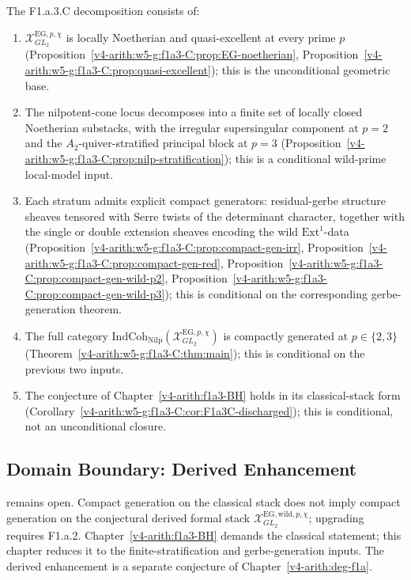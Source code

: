 \begin{proposition}[domain of F1.a.3.C]
\label{v4-arith:w5-g:f1a3-C:prop:domain-summary}
The F1.a.3.C decomposition consists of:
\begin{enumerate}
\item \(\mathcal{X}^{\mathrm{EG},p,\chi}_{GL_{2}}\) is locally
Noetherian and quasi-excellent at every prime \(p\)
(Proposition~\ref{v4-arith:w5-g:f1a3-C:prop:EG-noetherian},
Proposition~\ref{v4-arith:w5-g:f1a3-C:prop:quasi-excellent}); this is the
unconditional geometric base.
\item The nilpotent-cone locus decomposes into a finite set of
locally closed Noetherian substacks, with the irregular supersingular
component at \(p=2\) and the \(A_{2}\)-quiver-stratified principal block
at \(p=3\)
(Proposition~\ref{v4-arith:w5-g:f1a3-C:prop:nilp-stratification}); this is a
conditional wild-prime local-model input.
\item Each stratum admits explicit compact generators: residual-gerbe
structure sheaves tensored with Serre twists of the determinant character,
together with the single or double extension sheaves encoding the wild
\(\mathrm{Ext}^{1}\)-data
(Proposition~\ref{v4-arith:w5-g:f1a3-C:prop:compact-gen-irr},
Proposition~\ref{v4-arith:w5-g:f1a3-C:prop:compact-gen-red},
Proposition~\ref{v4-arith:w5-g:f1a3-C:prop:compact-gen-wild-p2},
Proposition~\ref{v4-arith:w5-g:f1a3-C:prop:compact-gen-wild-p3}); this is
conditional on the corresponding gerbe-generation theorem.
\item The full category
\(\mathrm{IndCoh}_{\mathrm{Nilp}}(\mathcal{X}^{\mathrm{EG},p,\chi}_{GL_{2}})\)
is compactly generated at \(p\in\{2,3\}\)
(Theorem~\ref{v4-arith:w5-g:f1a3-C:thm:main}); this is conditional on the
previous two inputs.
\item The conjecture of Chapter~\ref{v4-arith:f1a3-BH} holds in its
classical-stack form
(Corollary~\ref{v4-arith:w5-g:f1a3-C:cor:F1a3C-discharged}); this is conditional,
not an unconditional closure.
\end{enumerate}
\end{proposition}

\subsection{Domain Boundary: Derived Enhancement}

\begin{remark}
\label{v4-arith:w5-g:f1a3-C:residual:derived-extension}
 remains open.
Compact generation on the classical stack does not imply compact
generation on the conjectural derived formal stack
\(\mathcal{X}^{\mathrm{EG,wild},p,\chi}_{GL_{2}}\); upgrading requires F1.a.2.
Chapter~\ref{v4-arith:f1a3-BH} demands the classical statement; this
chapter reduces it to the finite-stratification and gerbe-generation
inputs. The derived enhancement is a separate conjecture of
Chapter~\ref{v4-arith:deg-f1a}.
\end{remark}

